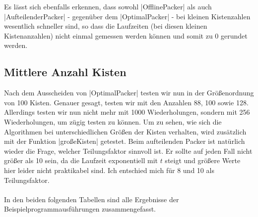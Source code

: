  Es lässt sich ebenfalls erkennen, dass sowohl |OfflinePacker| als auch |AufteilenderPacker| - gegenüber dem |OptimalPacker| -
  bei kleinen Kistenzahlen wesentlich schneller sind, so dass die Laufzeiten (bei diesen kleinen Kistenanzahlen) nicht einmal gemessen werden können
  und somit zu 0 gerundet werden.

\clearpage
\subsection{Mittlere Anzahl Kisten}
 Nach dem Ausscheiden von |OptimalPacker| testen wir nun in der Größenordnung von 100 Kisten.
 Genauer gesagt, testen wir mit den Anzahlen 88, 100 sowie 128.
 Allerdings testen wir nun nicht mehr mit 1000 Wiederholungen, sondern mit 256 Wiederholungen, um zügig testen zu können.
 Um zu sehen, wie sich die Algorithmen bei unterschiedlichen Größen der Kisten verhalten, wird zusätzlich mit der Funktion |großeKisten| getestet.
 Beim aufteilenden Packer ist natürlich wieder die Frage, welcher Teilungsfaktor sinnvoll ist.
 Er sollte auf jeden Fall nicht größer als 10 sein, da die Laufzeit exponentiell mit $t$ steigt und größere Werte hier leider nicht praktikabel sind.
 Ich entschied mich für 8 und 10 als Teilungsfaktor.
\paragraph{}
 In den beiden folgenden Tabellen sind alle Ergebnisse der Beispielprogrammausführungen zusammengefasst.

